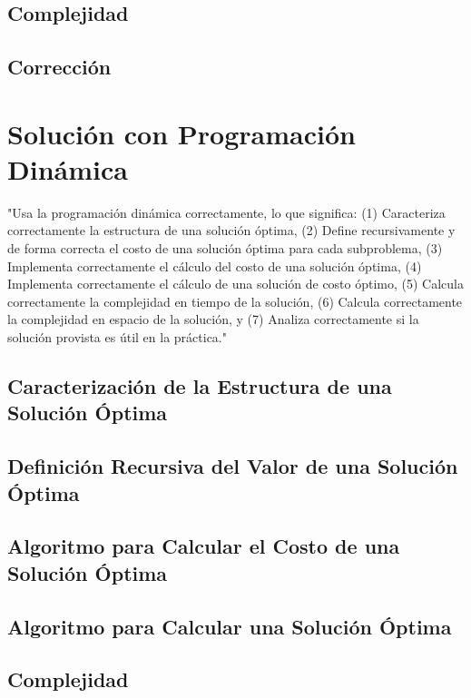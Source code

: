 \documentclass[letterpaper,10pt]{article}
\begin{document}
\subsection{Complejidad}
\label{subsec:complejidad_algoritmo_voraz}
\subsection{Corrección}
\label{subsec:correccion_algoritmo_voraz}

\section{Solución con Programación Dinámica}
\label{sec:programacion_dinamica}
"Usa la programación dinámica correctamente, lo que significa: (1) Caracteriza correctamente la estructura de una solución óptima, (2) Define recursivamente y de forma correcta el costo de una solución óptima para cada subproblema, (3) Implementa correctamente el cálculo del costo de una solución óptima, (4) Implementa correctamente el cálculo de una solución de costo óptimo, (5) Calcula correctamente la complejidad en tiempo de la solución, (6) Calcula correctamente la complejidad en espacio de la solución, y (7) Analiza correctamente si la solución provista es útil en la práctica."
\subsection{Caracterización de la Estructura de una Solución Óptima}
\label{subsec:caracterizacion_solucion_optima}
\subsection{Definición Recursiva del Valor de una Solución Óptima}
\label{subsec:definicion_solucion_optima}
\subsection{Algoritmo para Calcular el Costo de una Solución Óptima}
\label{subsec:algoritmo_costo_solucion_optima}
\subsection{Algoritmo para Calcular una Solución Óptima}
\label{subsec:algoritmo_solucion_optima}
\subsection{Complejidad}
\label{subsec:complejidad_programacion_dinamica}
\end{document}
